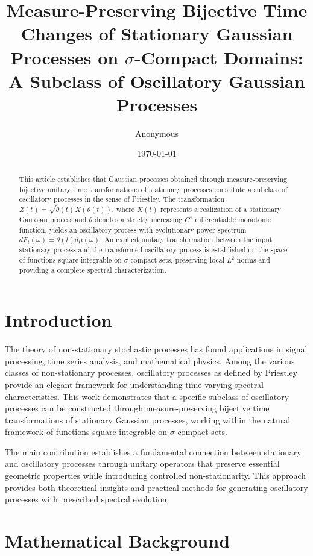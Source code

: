 \documentclass{article}
\title{Measure-Preserving Bijective Time Changes of Stationary Gaussian Processes on $\sigma$-Compact Domains: A Subclass of Oscillatory Gaussian Processes}
\author{Anonymous}
\date{\today}
\begin{document}
\maketitle

\begin{abstract}
This article establishes that Gaussian processes obtained through measure-preserving bijective unitary time transformations of stationary processes constitute a subclass of oscillatory processes in the sense of Priestley. The transformation $Z(t) = \sqrt{\dot{\theta}(t)} X(\theta(t))$, where $X(t)$ represents a realization of a stationary Gaussian process and $\theta$ denotes a strictly increasing $C^1$ differentiable monotonic function, yields an oscillatory process with evolutionary power spectrum $dF_t(\omega) = \dot{\theta}(t) d\mu(\omega)$. An explicit unitary transformation between the input stationary process and the transformed oscillatory process is established on the space of functions square-integrable on $\sigma$-compact sets, preserving local $L^2$-norms and providing a complete spectral characterization.
\end{abstract}

\tableofcontents

\section{Introduction}
The theory of non-stationary stochastic processes has found applications in signal processing, time series analysis, and mathematical physics. Among the various classes of non-stationary processes, oscillatory processes as defined by Priestley provide an elegant framework for understanding time-varying spectral characteristics. This work demonstrates that a specific subclass of oscillatory processes can be constructed through measure-preserving bijective time transformations of stationary Gaussian processes, working within the natural framework of functions square-integrable on $\sigma$-compact sets.

The main contribution establishes a fundamental connection between stationary and oscillatory processes through unitary operators that preserve essential geometric properties while introducing controlled non-stationarity. This approach provides both theoretical insights and practical methods for generating oscillatory processes with prescribed spectral evolution.

\section{Mathematical Background}
\end{document}
